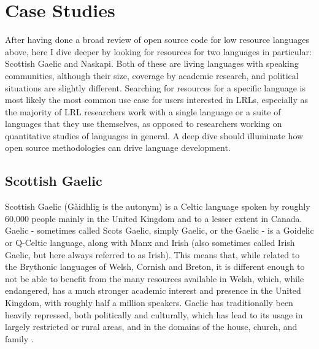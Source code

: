 \section{Case Studies}
\label{sec:case-studies}

After having done a broad review of open source code for low resource languages above, here I dive deeper by looking for resources for two languages in particular: Scottish Gaelic and Naskapi. Both of these are living languages with speaking communities, although their size, coverage by academic research, and political situations are slightly different. Searching for resources for a specific language is most likely the most common use case for users interested in LRLs, especially as the majority of LRL researchers work with a single language or a suite of languages that they use themselves, as opposed to researchers working on quantitative studies of languages in general. A deep dive should illuminate how open source methodologies can drive language development.

\subsection{Scottish Gaelic}
\label{sec:gaelic}

Scottish Gaelic (G\`aidhlig is the autonym) is a Celtic language spoken by roughly 60,000 people mainly in the United Kingdom and to a lesser extent in Canada. Gaelic - sometimes called Scots Gaelic, simply Gaelic, or the Gaelic - is a Goidelic or Q-Celtic language, along with Manx and Irish (also sometimes called Irish Gaelic, but here always referred to as Irish). This means that, while related to the Brythonic languages of Welsh, Cornish and Breton, it is different enough to not be able to benefit from the many resources available in Welsh, which, while endangered, has a much stronger academic interest and presence in the United Kingdom, with roughly half a million speakers. Gaelic has traditionally been heavily repressed, both politically and culturally, which has lead to its usage in largely restricted or rural areas, and in the domains of the house, church, and family \citep{mackinnon1991past}.

